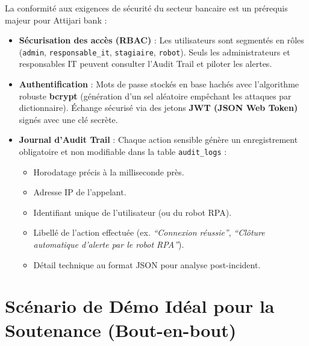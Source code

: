 \documentclass[11pt,a4paper]{article}
\begin{document}
La conformité aux exigences de sécurité du secteur bancaire est un prérequis majeur pour Attijari bank :
\begin{itemize}
    \item \textbf{Sécurisation des accès (RBAC)} : Les utilisateurs sont segmentés en rôles (\texttt{admin}, \texttt{responsable\_it}, \texttt{stagiaire}, \texttt{robot}). Seuls les administrateurs et responsables IT peuvent consulter l'Audit Trail et piloter les alertes.
    \item \textbf{Authentification} : Mots de passe stockés en base hachés avec l'algorithme robuste \textbf{bcrypt} (génération d'un sel aléatoire empêchant les attaques par dictionnaire). Échange sécurisé via des jetons \textbf{JWT (JSON Web Token)} signés avec une clé secrète.
    \item \textbf{Journal d'Audit Trail} : Chaque action sensible génère un enregistrement obligatoire et non modifiable dans la table \texttt{audit\_logs} :
    \begin{itemize}
        \item Horodatage précis à la milliseconde près.
        \item Adresse IP de l'appelant.
        \item Identifiant unique de l'utilisateur (ou du robot RPA).
        \item Libellé de l'action effectuée (ex. \textit{``Connexion réussie''}, \textit{``Clôture automatique d'alerte par le robot RPA''}).
        \item Détail technique au format JSON pour analyse post-incident.
    \end{itemize}
\end{itemize}

\section{Scénario de Démo Idéal pour la Soutenance (Bout-en-bout)}
\end{document}
